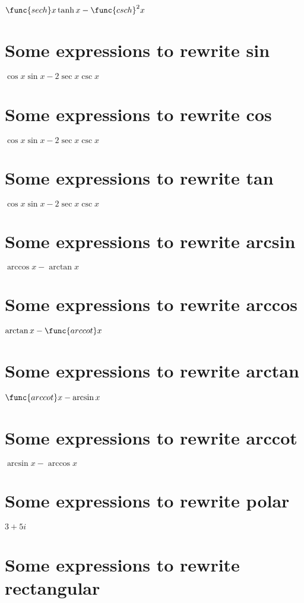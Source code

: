 \documentclass{article}
\begin{document}
$\func{sech}x\tanh x-\func{csch}^{2}x$

\section{Some expressions to rewrite sin}

$\cos x\sin x-2\sec x\csc x$

\section{Some expressions to rewrite cos}

$\cos x\sin x-2\sec x\csc x$

\section{Some expressions to rewrite tan}

$\cos x\sin x-2\sec x\csc x$

\section{Some expressions to rewrite arcsin}

$\arccos x-\arctan x$

\section{Some expressions to rewrite arccos}

$\arctan x-\func{arccot}x$

\section{Some expressions to rewrite arctan}

$\func{arccot}x-\arcsin x$

\section{Some expressions to rewrite arccot}

$\arcsin x-\arccos x$

\section{Some expressions to rewrite polar}

$3+5i$

\section{Some expressions to rewrite rectangular}
\end{document}
